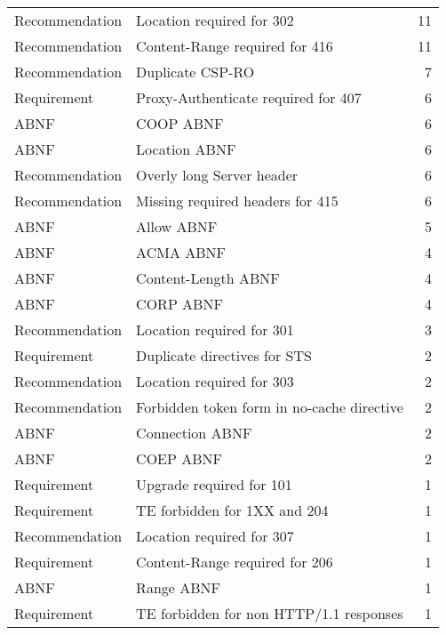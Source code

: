 \begin{tabular}{llr}
Recommendation &                   Location required for 302 &       11 \\
Recommendation &              Content-Range required for 416 &       11 \\
Recommendation &                            Duplicate CSP-RO &        7 \\
   Requirement &         Proxy-Authenticate required for 407 &        6 \\
          ABNF &                                   COOP ABNF &        6 \\
          ABNF &                               Location ABNF &        6 \\
Recommendation &                   Overly long Server header &        6 \\
Recommendation &            Missing required headers for 415 &        6 \\
          ABNF &                                  Allow ABNF &        5 \\
          ABNF &                                   ACMA ABNF &        4 \\
          ABNF &                         Content-Length ABNF &        4 \\
          ABNF &                                   CORP ABNF &        4 \\
Recommendation &                   Location required for 301 &        3 \\
   Requirement &                Duplicate directives for STS &        2 \\
Recommendation &                   Location required for 303 &        2 \\
Recommendation &  Forbidden token form in no-cache directive &        2 \\
          ABNF &                             Connection ABNF &        2 \\
          ABNF &                                   COEP ABNF &        2 \\
   Requirement &                    Upgrade required for 101 &        1 \\
   Requirement &                TE forbidden for 1XX and 204 &        1 \\
Recommendation &                   Location required for 307 &        1 \\
   Requirement &              Content-Range required for 206 &        1 \\
          ABNF &                                  Range ABNF &        1 \\
   Requirement &     TE forbidden for non HTTP/1.1 responses &        1 \\
\bottomrule
\end{tabular}
